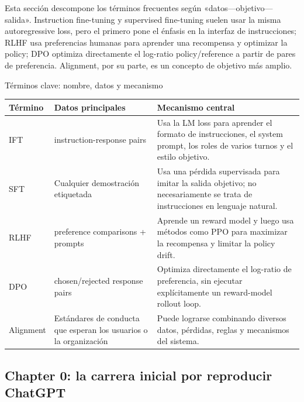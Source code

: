 Esta sección descompone los términos frecuentes según «datos—objetivo—salida». Instruction fine-tuning y supervised fine-tuning suelen usar la misma autoregressive loss, pero el primero pone el énfasis en la interfaz de instrucciones; RLHF usa preferencias humanas para aprender una recompensa y optimizar la policy; DPO optimiza directamente el log-ratio policy/reference a partir de pares de preferencia. Alignment, por su parte, es un concepto de objetivo más amplio.


\begin{knowledgebox}{Términos clave: nombre, datos y mecanismo}
\begin{tabularx}{\textwidth}{L{0.18\textwidth} L{0.24\textwidth} X}
\toprule
Término & Datos principales & Mecanismo central \\
\midrule
IFT & instruction-response pairs & Usa la LM loss para aprender el formato de instrucciones, el system prompt, los roles de varios turnos y el estilo objetivo. \\
SFT & Cualquier demostración etiquetada & Usa una pérdida supervisada para imitar la salida objetivo; no necesariamente se trata de instrucciones en lenguaje natural. \\
RLHF & preference comparisons + prompts & Aprende un reward model y luego usa métodos como PPO para maximizar la recompensa y limitar la policy drift. \\
DPO & chosen/rejected response pairs & Optimiza directamente el log-ratio de preferencia, sin ejecutar explícitamente un reward-model rollout loop. \\
Alignment & Estándares de conducta que esperan los usuarios o la organización & Puede lograrse combinando diversos datos, pérdidas, reglas y mecanismos del sistema. \\
\bottomrule
\end{tabularx}
\end{knowledgebox}


\subsection{Chapter 0: la carrera inicial por reproducir ChatGPT}


